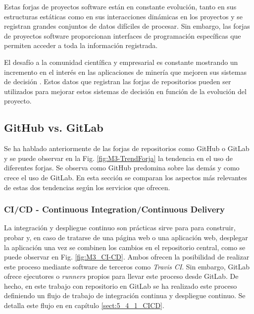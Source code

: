
 Estas forjas de proyectos software están en constante evolución, tanto en sus estructuras estáticas como en sus interacciones dinámicas en los proyectos y se registran grandes conjuntos de datos difíciles de procesar. Sin embargo, las forjas de proyectos software proporcionan interfaces de programación específicas que permiten acceder a toda la información registrada.

El  desafío a la comunidad científica y empresarial  es constante mostrando un incremento en el interés en las aplicaciones de minería que mejoren sus sistemas de decisión \citep{guemes-pena_emerging_2018}. Estos datos que registran las forjas de repositorios pueden ser utilizados para mejorar estos sistemas de decisión en función de la evolución del proyecto.

\subsection{GitHub vs. GitLab}\label{sect:3_2_1_GitHubVSGitLab}


Se ha hablado anteriormente de las forjas de repositorios como GitHub o GitLab y se puede observar en la Fig. \ref{fig:M3-TrendForja} la tendencia en el uso de diferentes forjas. Se observa como GitHub predomina sobre las demás y como crece el uso de GitLab. En esta sección se comparan los aspectos más relevantes de estas dos tendencias según los servicios que ofrecen.

\subsubsection{CI/CD - Continuous Integration/Continuous Delivery}
La integración y despliegue continuo son prácticas sirve para para construir, probar y, en caso de tratarse de una página web o una aplicación web, desplegar la aplicación una vez se combinen los cambios en el repositorio central, como se puede observar en Fig. \ref{fig:M3_CI-CD}. Ambos ofrecen la posibilidad de realizar este proceso mediante software de terceros como \textit{Travis CI}. Sin embargo, GitLab ofrece ejecutores o \textit{runners} propios para llevar este proceso desde GitLab. De hecho, en este trabajo con repositorio en GitLab se ha realizado este proceso definiendo un flujo de trabajo de integración continua y despliegue continuo. Se detalla este flujo en en capítulo \ref{sect:5_4_1_CICD}.

